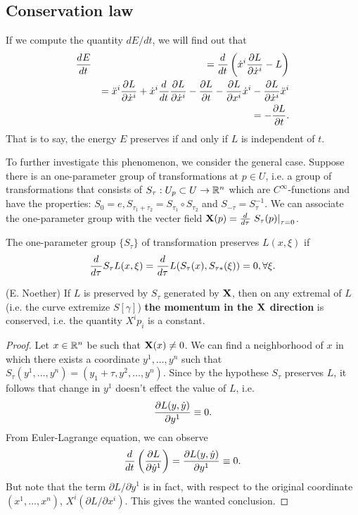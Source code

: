 \subsection{Conservation law}
If we compute the quantity $dE/dt$, we will find out that
\begin{eqnarray}
\frac{d^{} E}{d t^{}} &&= \frac{d^{}  }{d t^{}} \left( \dot{x}^i \frac{ \partial L}{ \partial \dot{x}^i } - L\right)
\nonumber\\
&&= \ddot{x}^i \frac{ \partial L}{ \partial \dot{x}^i } + \dot{x}^i \frac{d^{}  }{d t^{}}\frac{ \partial L}{ \partial \dot{x}^i } - \frac{ \partial L}{ \partial t } - \frac{ \partial L}{ \partial x^i }\dot{x}^i - \frac{ \partial L}{ \partial \dot{x}^i } \ddot{x}^i
\nonumber\\
&&= -\frac{ \partial L}{ \partial t }.
\nonumber
\end{eqnarray}
That is to say, the energy $E$ preserves if and only if $L$ is independent of $t$.

To further investigate this phenomenon, we consider the general case. Suppose there is an one-parameter group of transformations at $p \in U$, i.e. a group of transformations that consists of $S_{\tau}: U_p \subset U \rightarrow \mathbb{R}^n$ which are $C^{\infty}$-functions and have the properties: $S_0 = e, S_{\tau_1 + \tau_2} = S_{\tau_1} \circ S_{\tau_2}$ and $S_{-\tau} = S_{\tau}^{-1}$. We can associate the one-parameter group with the vecter field $\mathbf{X}(p) = \frac{d^{}  }{d \tau^{}}\left. S_{\tau}(p) \right|_{\tau = 0}$.

\begin{definition}
	The one-parameter group $\{S_{\tau}\}$ of transformation preserves $L(x, \xi)$ if
	\begin{eqnarray}
		\frac{d^{}  }{d \tau^{}} S_{\tau} L(x, \xi) = \frac{d^{}  }{d \tau^{}}L(S_{\tau}(x), S_{\tau *}(\xi)) = 0, \forall \xi.
		\label{cond:preserve_L}
	\end{eqnarray}
\end{definition}

\begin{theorem}
	(E. Noether) If $L$ is preserved by $S_{\tau}$ generated by $\mathbf{X}$, then on any extremal of $L$ (i.e. the curve extremize $S[\gamma]$) \textbf{the momentum in the $\mathbf{X}$ direction} is conserved, i.e. the quantity $X^ip_i$ is a constant.
\end{theorem}
\begin{proof}
	Let $x \in \mathbb{R}^n$ be such that $\mathbf{X}(x) \neq 0$. We can find a neighborhood of $x$ in which there exists a coordinate $y^1, \dots, y^n$ such that $S_{\tau}(y^1, \dots, y^n) = (y_1 + \tau, y^2, \dots, y^n)$. Since by the hypothese $S_{\tau}$ preserves $L$, it follows that change in $y^1$ doesn't effect the value of $L$, i.e. \[ \frac{ \partial L(y, \dot{y})}{ \partial y^1 } \equiv 0. \] From Euler-Lagrange equation, we can observe \[ \frac{d^{}  }{d t^{}} \left( \frac{ \partial L}{ \partial \dot{y}^1 } \right) = \frac{ \partial L(y, \dot{y})}{ \partial y^1 } \equiv 0. \] But note that the term $\partial L/ \partial \dot{y}^1$ is in fact, with respect to the original coordinate $(x^1, \dots, x^n)$, $X^i(\partial L/ \partial x^i)$. This gives the wanted conclusion.
\end{proof}



